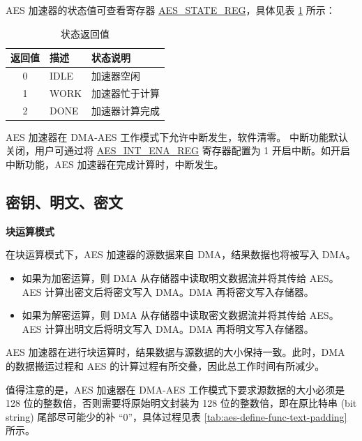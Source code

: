 \documentclass[main\_\_CN.tex]{subfiles}
\begin{document}
\clearpage
AES 加速器的状态值可查看寄存器 \hyperref[regdesc:AESSTATEREG]{AES\_STATE\_REG}，具体见表 \ref{tab:aes-state-value-dma} 所示：

\begin{longtable}[c]{ | c | l | l | }
\caption{状态返回值}
\label{tab:aes-state-value-dma}
\\\hline 
\rowcolor{lightgray}
\textbf{返回值} & \textbf{描述} &  \textbf{状态说明} \\ \hline

    0                   & IDLE      &   加速器空闲\\ \hline
    1                   & WORK      &   加速器忙于计算     \\ \hline
    2                   & DONE      &   加速器计算完成     \\ \hline
\end{longtable}

AES 加速器在 DMA-AES 工作模式下允许中断发生，软件清零。
中断功能默认关闭，用户可通过将 \hyperref[regdesc:AESINTENAREG]{AES\_INT\_ENA\_REG} 寄存器配置为 1 开启中断。如开启中断功能，AES 加速器在完成计算时，中断发生。

\subsection{密钥、明文、密文}

\textbf{块运算模式}

在块运算模式下，AES 加速器的源数据来自 DMA，结果数据也将被写入 DMA。
\begin{itemize}
    \item 如果为加密运算，则 DMA 从存储器中读取明文数据流并将其传给 AES。AES 计算出密文后将密文写入 DMA。DMA 再将密文写入存储器。
    \item 如果为解密运算，则 DMA 从存储器中读取密文数据流并将其传给 AES。AES 计算出明文后将明文写入 DMA。DMA 再将明文写入存储器。
\end{itemize}

AES 加速器在进行块运算时，结果数据与源数据的大小保持一致。此时，DMA 的数据搬运过程和 AES 的计算过程有所交叠，因此总工作时间有所减少。

\label{api:testpadding}值得注意的是，AES 加速器在 DMA-AES 工作模式下要求源数据的大小必须是 128 位的整数倍，否则需要将原始明文封装为 128 位的整数倍，即在原比特串 (bit string) 尾部尽可能少的补 “0”，具体过程见表 \ref{tab:aes-define-func-text-padding} 所示。
\end{document}
